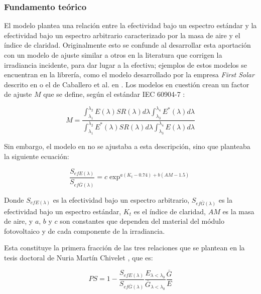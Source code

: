 \subsubsection{Fundamento teórico}

El modelo \cite{Martín_Ruiz_1999} plantea una relación entre la efectividad bajo un \gls{espectro estándar} y la efectividad bajo un \gls{espectro arbitrario} caracterizado por la masa de aire y el índice de claridad. Originalmente esto se confunde al desarrollar esta aportación con un modelo de ajuste similar a otros en la literatura que corrigen la irradiancia incidente, para dar lugar a la efectiva; ejemplos de estos modelos se encuentran en la librería, como el modelo desarrollado por la empresa \textit{First Solar} descrito en \cite{Lee_Panchula_2016} o el de Caballero et al. en \cite{Caballero_Fernández_Theristis_Almonacid_Nofuentes_2018}. Los modelos en cuestión crean un factor de ajuste $M$ que se define, según el \gls{estándar} IEC 60904-7 \cite[Eq. (2)]{Caballero_Fernández_Theristis_Almonacid_Nofuentes_2018}:

\begin{equation} \label{eq:ajuste_espectral}
    M = \frac
    {\int_{\lambda_1}^{\lambda_2} E(\lambda) SR(\lambda) d\lambda \int_{\lambda_3}^{\lambda_4} E^*(\lambda) d\lambda}
    {\int_{\lambda_1}^{\lambda_2} E^*(\lambda) SR(\lambda) d\lambda \int_{\lambda_3}^{\lambda_4} E(\lambda) d\lambda}
\end{equation}

Sin embargo, el modelo en \cite{Martín_Ruiz_1999} no se ajustaba a esta descripción, sino que planteaba la siguiente ecuación:

\begin{equation} \label{eq:ajuste_articulo_Nuria}
    \frac{S_{efE(\lambda)}}{S_{ef\bar{G}(\lambda)}} = c \exp^{a (K_t - 0.74) + b (AM - 1.5)}
\end{equation}

Donde $S_{efE(\lambda)}$ es la efectividad bajo un espectro arbitrario, $S_{ef\bar{G}(\lambda)}$ es la efectividad bajo un espectro estándar, $K_t$ es el índice de claridad, $AM$ es la masa de aire, y $a$, $b$ y $c$ son constantes que dependen del material del \gls{módulo} fotovoltaico y de cada componente de la irradiancia.

Esta constituye la primera fracción de las tres relaciones que se plantean en la tesis doctoral de Nuria Martín Chivelet \cite{Martín_Chivelet_1999}, que es:

\begin{equation}
    PS = 1 - \frac{S_{efE(\lambda)}}{S_{ef\bar{G}(\lambda)}}\frac{E_{\lambda<\lambda_0}}{\bar{G}_{\lambda<\lambda_0}}\frac{\bar{G}}{E}
\end{equation}

